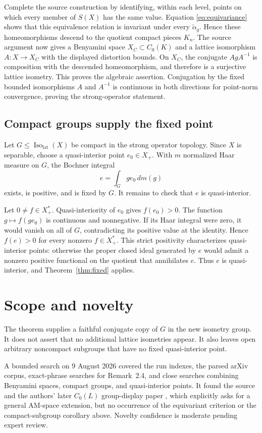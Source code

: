 \documentclass[10pt]{article}
\newcommand{\Iso}{\operatorname{Iso}_{\mathrm{lat}}}
\begin{document}
Complete the source construction by identifying, within each level, points
on which every member of $S(X)$ has the same value. Equation
\eqref{eq:equivariance} shows that this equivalence relation is invariant
under every $\widetilde\alpha_g$. Hence these homeomorphisms descend to the
quotient compact pieces $K_n$. The source argument now gives a Benyamini
space $X_C\subset C_0(K)$ and a lattice isomorphism $A:X\to X_C$ with the
displayed distortion bounds. On $X_C$, the conjugate $AgA^{-1}$ is
composition with the descended homeomorphism, and therefore is a surjective
lattice isometry. This proves the algebraic assertion. Conjugation by the
fixed bounded isomorphisms $A$ and $A^{-1}$ is continuous in both directions
for point-norm convergence, proving the strong-operator statement.

\subsection*{Compact groups supply the fixed point}

Let $G\leq\Iso(X)$ be compact in the strong operator topology. Since $X$ is
separable, choose a quasi-interior point $e_0\in X_+$. With $m$ normalized
Haar measure on $G$, the Bochner integral
\[
 e=\int_G g e_0\,dm(g)
\]
exists, is positive, and is fixed by $G$. It remains to check that $e$ is
quasi-interior.

Let $0\neq f\in X^*_+$. Quasi-interiority of $e_0$ gives $f(e_0)>0$. The
function $g\mapsto f(ge_0)$ is continuous and nonnegative. If its Haar
integral were zero, it would vanish on all of $G$, contradicting its positive
value at the identity. Hence $f(e)>0$ for every nonzero $f\in X^*_+$. This
strict positivity characterizes quasi-interior points: otherwise the proper
closed ideal generated by $e$ would admit a nonzero positive functional on
the quotient that annihilates $e$. Thus $e$ is quasi-interior, and
Theorem~\ref{thm:fixed} applies.

\section{Scope and novelty}

The theorem supplies a faithful conjugate copy of $G$ in the new isometry
group. It does not assert that no additional lattice isometries appear. It
also leaves open arbitrary noncompact subgroups that have no fixed
quasi-interior point.

A bounded search on 9 August 2026 covered the run indexes, the parsed arXiv
corpus, exact-phrase searches for Remark~2.4, and close searches combining
Benyamini spaces, compact groups, and quasi-interior points. It found the
source and the authors' later $C_0(L)$ group-display paper \cite{followup},
which explicitly asks for a general AM-space extension, but no occurrence of
the equivariant criterion or the compact-subgroup corollary above. Novelty
confidence is moderate pending expert review.
\end{document}
